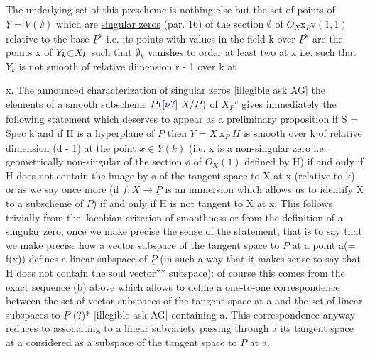 \documentclass[11pt]{article}
\newcommand{\scanpage}[1]{\par\bigskip\noindent{\small\sffamily[scan #1]}\par}
\newcommand{\mspage}[1]{{\small\sffamily[p.\,#1]}}
\newcommand{\hand}[1]{\textcolor{blue}{#1}}
\newcommand{\uline}[1]{\underline{#1}}
\newcommand{\unsure}[1]{[#1?]}
\begin{document}
The underlying set of this prescheme is nothing else but the
set of points of $\underline{Y} = V(\emptyset)$ which are \uline{singular zeros} (par. 16) of
the section $\emptyset$ of $O_X\mathrm{x}_{\underline{P}}\mathrm{v}(1, 1)$ relative to the base $\underline{P}^{\mathrm{v}}$ i.e. its
points with values in the field k over $\underline{P}^{\mathrm{v}}$ are the points x of
$Y_k \hand{\subset} X_k$ such that $\emptyset_k$ vanishes to order at least two at x i.e.
such that $Y_k$ is not smooth of relative dimension r - 1 over k at

\clearpage
\scanpage{24/44}
\mspage{44}

x.  The announced characterization of singular zeros [illegible
ask AG] the elements of a smooth subscheme $\underline{P}(\hand{\unsure{\nu}}\ X/\underline{P})$ of $X_{\underline{P}}{}^{v}$ gives
immediately the following statement which deserves to appear as a
preliminary proposition if S = Spec k and if H is a hyperplane of
$\underline{P}$ then $Y = X \ \mathrm{x}_{\underline{P}}\ H$ is smooth over k of relative dimension (d - 1)
at the point $x \in \underline{Y}(k)$ (i.e. x is a non-singular zero i.e.
geometrically non-singular of the section {\o} of $O_X(1)$ defined by H)
if and only if H does not contain the image by {\o} of the tangent
space to X at x (relative to k) or as we say once more (if
$f{:}X \to \underline{P}$ is an immersion which allows us to identify X to a
subscheme of $\underline{P}$) if and only if H is not tangent to X at x.  This
follows trivially from the Jacobian criterion of smoothness or
from the definition of a singular zero, once we make precise the
sense of the statement, that is to say that we make precise how a
vector subspace of the tangent space to $\underline{P}$ at a point a(= f(x))
defines a linear subspace of $\underline{P}$ (in such a way that it makes sense
to say that H does not contain the soul vector** subspace): of
course this comes from the exact sequence (b) above which allows
to define a one-to-one correspondence between the set of vector
subspaces of the tangent space at a and the set of linear
subspaces to $\underline{P}$ (?)* [illegible ask AG] containing a.  This
correspondence anyway reduces to associating to a linear
subvariety passing through a its tangent space at a considered as
a subspace of the tangent space to $\underline{P}$ at a.
\end{document}
